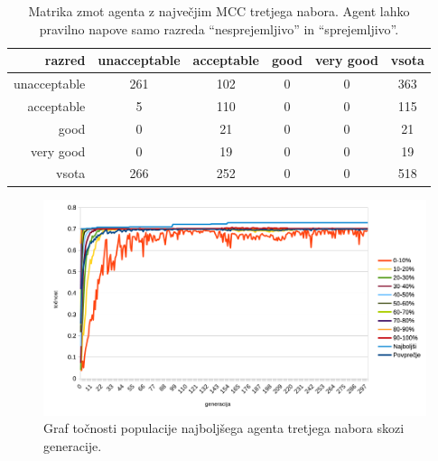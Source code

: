 \begin{table}[H]
    \centering
    \begin{tabular}{||rccccc||}
        \hline
        razred       & unacceptable & acceptable & good & very good & vsota \\ \hline
        unacceptable & 261          & 102        & 0    & 0         & 363   \\ \hline
        acceptable   & 5            & 110        & 0    & 0         & 115   \\ \hline
        good         & 0            & 21         & 0    & 0         & 21    \\ \hline
        very good    & 0            & 19         & 0    & 0         & 19    \\ \hline
        vsota        & 266          & 252        & 0    & 0         & 518   \\ \hline
    \end{tabular}
    \caption{Matrika zmot agenta z največjim MCC tretjega nabora. Agent lahko pravilno napove samo razreda \enquote{nesprejemljivo} in \enquote{sprejemljivo}.}
    \label{tab:car_mcc_3}
\end{table}

\begin{figure}[H]
    \begin{center}
        \includegraphics[width=13cm]{car/3/acc}
    \end{center}
    \caption{Graf točnosti populacije najboljšega agenta tretjega nabora skozi generacije.}
    \label{fig:car_acc_3}
\end{figure}

